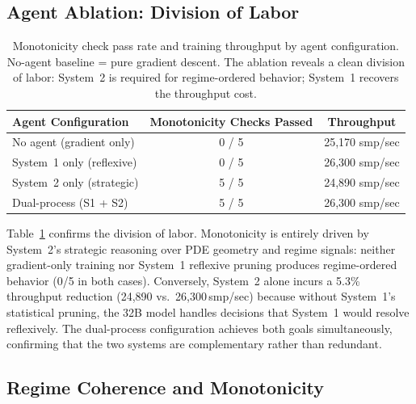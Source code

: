 \documentclass[11pt,a4paper]{article}
\begin{document}
\subsection{Agent Ablation: Division of Labor}

\begin{table}[ht]
\centering
\caption{Monotonicity check pass rate and training throughput by agent configuration.
No-agent baseline = pure gradient descent. The ablation reveals a clean division of
labor: System~2 is required for regime-ordered behavior; System~1 recovers the
throughput cost.}
\small
\begin{tabular}{@{}lcc@{}}
\toprule
Agent Configuration & Monotonicity Checks Passed & Throughput \\
\midrule
No agent (gradient only) & 0 / 5 & 25,170 smp/sec \\
System~1 only (reflexive) & 0 / 5 & 26,300 smp/sec \\
System~2 only (strategic) & 5 / 5 & 24,890 smp/sec \\
Dual-process (S1 + S2)    & 5 / 5 & 26,300 smp/sec \\
\bottomrule
\end{tabular}
\label{tab:ablation}
\end{table}

Table~\ref{tab:ablation} confirms the division of labor. Monotonicity is entirely driven
by System~2's strategic reasoning over PDE geometry and regime signals: neither
gradient-only training nor System~1 reflexive pruning produces regime-ordered behavior
(0/5 in both cases). Conversely, System~2 alone incurs a 5.3\% throughput reduction
(24,890 vs.\ 26,300\,smp/sec) because without System~1's statistical pruning, the 32B
model handles decisions that System~1 would resolve reflexively. The dual-process
configuration achieves both goals simultaneously, confirming that the two systems are
complementary rather than redundant.

\subsection{Regime Coherence and Monotonicity}
\end{document}

